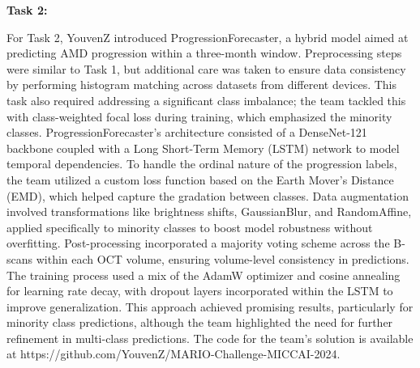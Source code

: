 \documentclass{article}
\begin{document}
\textbf{Task 2:} 

For Task 2, YouvenZ introduced ProgressionForecaster, a hybrid model aimed at predicting AMD progression within a three-month window. Preprocessing steps were similar to Task 1, but additional care was taken to ensure data consistency by performing histogram matching across datasets from different devices. This task also required addressing a significant class imbalance; the team tackled this with class-weighted focal loss during training, which emphasized the minority classes.
ProgressionForecaster’s architecture consisted of a DenseNet-121 backbone coupled with a Long Short-Term Memory (LSTM) network to model temporal dependencies. To handle the ordinal nature of the progression labels, the team utilized a custom loss function based on the Earth Mover’s Distance (EMD), which helped capture the gradation between classes. Data augmentation involved transformations like brightness shifts, GaussianBlur, and RandomAffine, applied specifically to minority classes to boost model robustness without overfitting. Post-processing incorporated a majority voting scheme across the B-scans within each OCT volume, ensuring volume-level consistency in predictions.
The training process used a mix of the AdamW optimizer and cosine annealing for learning rate decay, with dropout layers incorporated within the LSTM to improve generalization. This approach achieved promising results, particularly for minority class predictions, although the team highlighted the need for further refinement in multi-class predictions. The code for the team’s solution is available at https://github.com/YouvenZ/MARIO-Challenge-MICCAI-2024.
\end{document}

